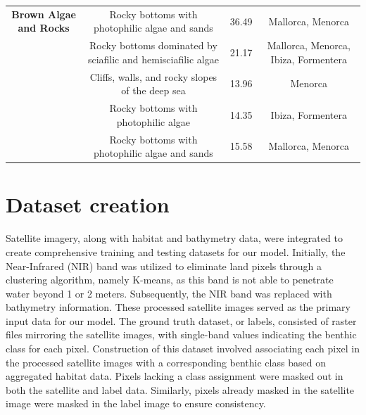 \begin{table}
{\begin{tabular}{|c|c|c|c|}
            \\
            \hline
            \textbf{Brown Algae and Rocks}    & Rocky bottoms with photophilic
            algae and sands                   & 36.49
                                              & Mallorca, Menorca
            \\
                                              & Rocky bottoms dominated by
            sciafilic and hemisciafilic algae &
            21.17                             & Mallorca, Menorca, Ibiza,
            Formentera
            \\
                                              & Cliffs, walls, and rocky slopes
            of
            the deep sea                      & 13.96
                                              & Menorca
            \\
                                              & Rocky bottoms with photophilic
            algae                             & 14.35
                                              & Ibiza, Formentera
            \\
                                              & Rocky bottoms with photophilic
            algae and sands                   & 15.58
                                              &
            Mallorca, Menorca

            \\
            \hline
        \end{tabular}}
\end{table}

\section{Dataset creation}\label{app:dataset_creation}

Satellite imagery, along with habitat and bathymetry data, were integrated
to create comprehensive training and testing datasets for our model. Initially,
the Near-Infrared (NIR) band was utilized to eliminate land pixels through a
clustering algorithm, namely K-means, as this band is not able to
penetrate water beyond 1 or 2 meters. Subsequently, the NIR band was
replaced with bathymetry information. These processed satellite images served
as the primary input data for our
model. The ground truth dataset, or labels, consisted of raster files mirroring
the satellite images, with single-band values indicating the benthic class for
each pixel. Construction of this dataset involved associating each pixel in the
processed satellite images with a corresponding benthic class based on
aggregated habitat data. Pixels lacking a class assignment were masked out in
both the satellite and label data. Similarly, pixels already masked in the
satellite image were masked in the label image to ensure consistency.


